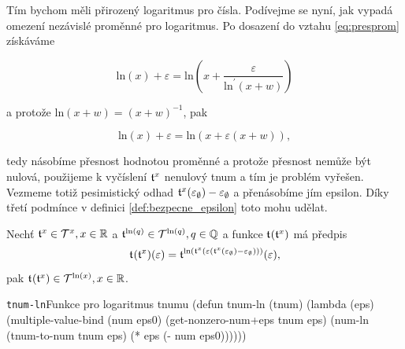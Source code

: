 Tím bychom měli přirozený logaritmus pro čísla. Podívejme se nyní, jak vypadá omezení nezávislé proměnné pro logaritmus. Po dosazení do vztahu \ref{eq:presprom} získáváme

\begin{equation}
\mathrm{ln}(x)+\varepsilon=\mathrm{ln}\left(x+\frac{\varepsilon}{\mathrm{ln}^{'}(x+w)}\right)
\end{equation}

a protože $\mathrm{ln}(x+w)=(x+w)^{-1}$, pak

\begin{equation}
\mathrm{ln}(x)+\varepsilon=\mathrm{ln}(x+\varepsilon(x+w)),
\end{equation}

tedy násobíme přesnost hodnotou proměnné a protože přesnost nemůže být nulová, použijeme k vyčíslení $\mathfrak{t}^{x}$ nenulový tnum a tím je problém vyřešen. Vezmeme totiž pesimistický odhad $\mathfrak{t}^{x}(\varepsilon_\emptyset)-\varepsilon_\emptyset$ a přenásobíme jím epsilon. Díky třetí podmínce v definici \ref{def:bezpecne_epsilon} toto mohu udělat.
\begin{fact}
Nechť $\mathfrak{t}^{x}\in\mathcal{T}^{x},x\in\mathbb{R}$ a $\mathfrak{t}^{\mathrm{ln}(q)}\in\mathcal{T}^{\mathrm{ln}(q)},q\in\mathbb{Q}$ a funkce $\mathfrak{t}^{}(\mathfrak{t}^{x})$ má předpis
\begin{equation}
\mathfrak{t}^{}(\mathfrak{t}^{x})(\varepsilon)=\mathfrak{t}^{\mathrm{ln}(\mathfrak{t}^{x}(\varepsilon(\mathfrak{t}^{x}(\varepsilon_\emptyset)-\varepsilon_\emptyset)))}(\varepsilon),
\end{equation}
pak $\mathfrak{t}^{}(\mathfrak{t}^{x})\in\mathcal{T}^{\mathrm{ln}(x)},x\in\mathbb{R}$.
\end{fact}

\begin{lispcode}{\texttt{tnum-ln}}{Funkce pro logaritmus tnumu}
(\textcolor{funkcionalni}{defun} \textcolor{pojmenovan}{tnum-ln} (tnum)
  (\textcolor{funkcionalni}{lambda} (eps)
    (\textcolor{matematicke}{multiple-value-bind} (num eps0)
        (\textcolor{moje}{get-nonzero-num+eps} tnum eps)
      (\textcolor{moje}{num-ln} (\textcolor{moje}{tnum-to-num} tnum eps) (\textcolor{matematicke}{*} eps (\textcolor{matematicke}{-} num eps0))))))
\end{lispcode}

